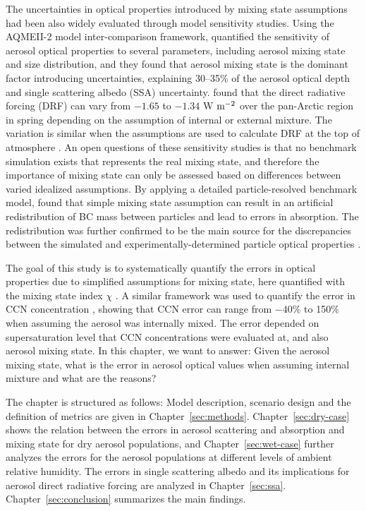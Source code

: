 \documentclass[edeposit,fullpage]{uiucthesis2009}
\begin{document}
The uncertainties in optical properties introduced by mixing state
assumptions had been also widely evaluated through model sensitivity
studies.  Using the AQMEII-2 model inter-comparison framework,
\citet{Curci2015} quantified the sensitivity of aerosol optical
properties to several parameters, including aerosol mixing state and
size distribution, and they found that aerosol mixing state is the
dominant factor introducing uncertainties, explaining 30--35\% of the
aerosol optical depth and single scattering albedo (SSA)
uncertainty. \citet{kodros2018size} found that the direct radiative
forcing (DRF) can vary from $-1.65$ to $-1.34$ W $\rm m^{-2}$ over the
pan-Arctic region in spring depending on the assumption of internal or
external mixture. The variation is similar when the assumptions are
used to calculate DRF at the top of atmosphere
\citep{ma2012aerosol}. An open questions of these sensitivity studies
is that no benchmark simulation exists that represents the real mixing
state, and therefore the importance of mixing state can only be
assessed based on differences between varied idealized assumptions. By
applying a detailed particle-resolved benchmark model,
\citet{Fierce2017} found that simple mixing state assumption can
result in an artificial redistribution of BC mass between particles
and lead to errors in absorption. The redistribution was further
confirmed to be the main source for the discrepancies between the
simulated and experimentally-determined particle optical properties
\citep{Fierce2020}.

The goal of this study is to systematically quantify the errors in
optical properties due to simplified assumptions for mixing state,
here quantified with the mixing state index $\chi$
\citet{Riemer2013a}. A similar framework was used to quantify the
error in CCN concentration \citep{Ching2017}, showing that CCN error
can range from $-40$\% to 150\% when assuming the aerosol was
internally mixed. The error depended on supersaturation level that CCN
concentrations were evaluated at, and also aerosol mixing state. In this
chapter, we want to answer: Given the aerosol mixing state, what is
the error in aerosol optical values when assuming internal mixture and
what are the reasons?

The chapter is structured as follows: Model description, scenario design and
the definition of metrics are given in
Chapter~\ref{sec:methods}. Chapter~\ref{sec:dry-case} shows the relation
between the errors in aerosol scattering and absorption and mixing
state for dry aerosol populations, and Chapter~\ref{sec:wet-case}
further analyzes the errors for the aerosol populations at different
levels of ambient relative humidity. The errors in single scattering
albedo and its implications for aerosol direct radiative forcing are
analyzed in Chapter~\ref{sec:ssa}. Chapter~\ref{sec:conclusion}
summarizes the main findings.
\end{document}
